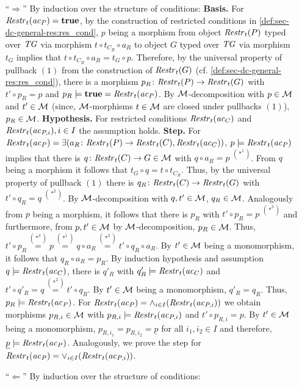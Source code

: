 \begin{enumerate}
  \item[``$\Rightarrow$''] By induction over the structure of conditions:
  \textbf{Basis.} For $\mathit{Restr}_t(\mathit{ac}_P)=\textbf{true}$, by the construction of restricted conditions in \cref{def:sec-dc-general-res:res_cond}, $p$ being a morphism from object $\mathit{Restr}_t(P)$ typed over $\mathit{TG}$ via morphism $t \circ t_{C_R} \circ a_R$ to object $G$ typed over $\mathit{TG}$ via morphism $t_G$ implies that $t \circ t_{C_R} \circ a_R=t_G \circ p$.
  Therefore, by the universal property of pullback $(1)$ from the construction of $\mathit{Restr}_t(G)$ (cf. \cref{def:sec-dc-general-res:res_cond}), there is a morphism $p_R\colon \mathit{Restr}_t(P) \to \mathit{Restr}_t(G)$ with $t' \circ p_R=p$ and $p_R \models \textbf{true}=\mathit{Restr}_t(\mathit{ac}_P)$.
  By ${\cal M}$-decomposition with $p \in {\cal M}$ and $t' \in {\cal M}$ (since, ${\cal M}$-morphisms $t \in {\cal M}$ are closed under pullbacks $(1)$), $p_R \in {\cal M}$.
  \textbf{Hypothesis.} For restricted conditions $\mathit{Restr}_t(\mathit{ac}_C)$ and $\mathit{Restr}_t(\mathit{ac}_{P,i}),i \in I$ the assumption holds.
  \textbf{Step.} For $\mathit{Restr}_t(\mathit{ac}_P)=\exists(a_R\colon \mathit{Restr}_t(P) \to \mathit{Restr}_t(C),\mathit{Restr}_t(\mathit{ac}_C))$, $p \models \mathit{Restr}_t(\mathit{ac}_P)$ implies that there is $q\colon \mathit{Restr}_t(C) \to G \in {\cal M}$ with $q \circ a_R=p$ $^{(*^1)}$.
  From $q$ being a morphism it follows that $t_G \circ q=t \circ t_{C_R}$.
  Thus, by the universal property of pullback $(1)$ there is $q_R\colon \mathit{Restr}_t(C) \to \mathit{Restr}_t(G)$ with $t' \circ q_R=q$ $^{(*^2)}$.
  By ${\cal M}$-decomposition with $q,t'\in {\cal M}$, $q_R \in {\cal M}$.
  Analogously from $p$ being a morphism, it follows that there is $p_R$ with $t' \circ p_R=p$ $^{(*^3)}$ and furthermore, from $p,t' \in {\cal M}$ by ${\cal M}$-decomposition, $p_R \in {\cal M}$.
  Thus, $t' \circ p_R \stackrel{(*^3)}{=} p \stackrel{(*^1)}{=} q \circ a_R \stackrel{(*^2)}{=} t' \circ q_R \circ a_R$.
  By $t' \in {\cal M}$ being a monomorphism, it follows that $q_R \circ a_R=p_R$.
  By induction hypothesis and assumption $q \models \mathit{Restr}_t(\mathit{ac}_C)$, there is $q'_R$ with $q'_R \models \mathit{Restr}_t(\mathit{ac}_C)$ and $t' \circ q'_R=q \stackrel{(*^2)}{=} t' \circ q_R$.
  By $t' \in {\cal M}$ being a monomorphism, $q'_R=q_R$.
  Thus, $p_R \models \mathit{Restr}_t(\mathit{ac}_P)$.
  For $\mathit{Restr}_t(\mathit{ac}_P)=\wedge_{i \in I}(\mathit{Restr}_t(\mathit{ac}_{P,i}))$ we obtain morphisms $p_{R,i} \in {\cal M}$ with $p_{R,i} \models \mathit{Restr}_t(\mathit{ac}_{P,i})$ and $t' \circ p_{R,i}=p$.
  By $t' \in {\cal M}$ being a monomorphism, $p_{R,i_1}=p_{R,i_2}=\underline{p}$ for all $i_1,i_2 \in I$ and therefore, $\underline{p} \models \mathit{Restr}_t(\mathit{ac}_P)$.
  Analogously, we prove the step for $\mathit{Restr}_t(\mathit{ac}_P)=\vee_{i \in I}(\mathit{Restr}_t(\mathit{ac}_{P,i}))$.
  \item[``$\Leftarrow$''] By induction over the structure of conditions:

\end{enumerate}
